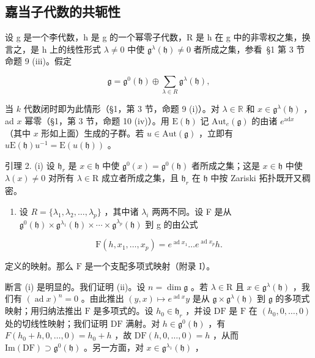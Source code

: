 \subsection{嘉当子代数的共轭性}

设 g 是一个李代数，h 是 g 的一个幂零子代数，R 是 h 在 g 中的非零权之集，换言之，是 h 上的线性形式 \(\lambda \neq 0\) 中使 \(\mathfrak{g}^{\lambda}(\mathfrak{h}) \neq 0\) 者所成之集，参看~§1 第 3 节命题 9 (iii)。假定

\[
\mathfrak {g} = \mathfrak {g} ^ {0} (\mathfrak {h}) \oplus \sum_ {\lambda \in R} \mathfrak {g} ^ {\lambda} (\mathfrak {h}),
\]

当 \(k\) 代数闭时即为此情形（§1，第 3 节，命题 9 (i)）。对 \(\lambda \in \mathbb{R}\) 和 \(x \in \mathfrak{g}^{\lambda}(\mathfrak{h})\) ，ad \(x\) 幂零（§1，第 3 节，命题 10 (iv)）。用 \(\mathrm{E}(\mathfrak{h})\) 记 \(\mathrm{Aut}_e(\mathfrak{g})\) 的由诸 \(e^{\mathrm{ad}x}\) （其中 \(x\) 形如上面）生成的子群。若 \(u \in \mathrm{Aut}(\mathfrak{g})\) ，立即有 \(u\mathrm{E}(\mathfrak{h})u^{-1} = \mathrm{E}(u(\mathfrak{h}))\) 。

引理 2. (i) 设 \(\mathfrak{h}_r\) 是 \(x\in \mathfrak{h}\) 中使 \(\mathfrak{g}^0 (x) = \mathfrak{g}^0 (\mathfrak{h})\) 者所成之集；这是 \(x\in \mathfrak{h}\) 中使 \(\lambda (x)\neq 0\) 对所有 \(\lambda \in \mathrm{R}\) 成立者所成之集，且 \(\mathfrak{h}_r\) 在 \(\mathfrak{h}\) 中按 Zariski 拓扑既开又稠密。

\begin{enumerate}
\def\labelenumi{(\roman{enumi})}
\setcounter{enumi}{1}
\tightlist
\item
  设 \(R = \{\lambda_{1}, \lambda_{2}, \ldots, \lambda_{p}\}\) ，其中诸 \(\lambda_{i}\) 两两不同。设 F 是从 \(\mathfrak{g}^{0}(\mathfrak{h}) \times \mathfrak{g}^{\lambda_{1}}(\mathfrak{h}) \times \cdots \times \mathfrak{g}^{\lambda_{p}}(\mathfrak{h})\) 到 g 的由公式
\end{enumerate}

\[
\mathrm{F} (h, x _ {1}, \dots , x _ {p}) = e ^ {\operatorname{ad} x _ {1}} \dots e ^ {\operatorname{ad} x _ {p}} h.
\]

定义的映射。那么 \(\mathrm{F}\) 是一个支配多项式映射（附录 I）。

断言 (i) 是明显的。我们证明 (ii)。设 \(n = \dim \mathfrak{g}\) 。若 \(\lambda \in \mathrm{R}\) 且 \(x \in \mathfrak{g}^{\lambda}(\mathfrak{h})\) ，我们有 \((\operatorname{ad} x)^n = 0\) 。由此推出 \((y, x) \mapsto e^{\operatorname{ad} x} y\) 是从 \(\mathfrak{g} \times \mathfrak{g}^{\lambda}(\mathfrak{h})\) 到 \(\mathfrak{g}\) 的多项式映射；用归纳法推出 \(\mathrm{F}\) 是多项式的。设 \(h_0 \in \mathfrak{h}_r\) ，并设 \(\mathrm{DF}\) 是 \(\mathrm{F}\) 在 \((h_0, 0, \ldots, 0)\) 处的切线性映射；我们证明 \(\mathrm{DF}\) 满射。对 \(h \in \mathfrak{g}^{0}(\mathfrak{h})\) ，有 \(F(h_{0} + h, 0, \ldots, 0) = h_{0} + h\) ，故 \(\mathrm{DF}(h, 0, \ldots, 0) = h\) ，从而 \(\mathrm{Im}(\mathrm{DF}) \supset \mathfrak{g}^{0}(\mathfrak{h})\) 。另一方面，对 \(x \in \mathfrak{g}^{\lambda_{1}}(\mathfrak{h})\) ，

